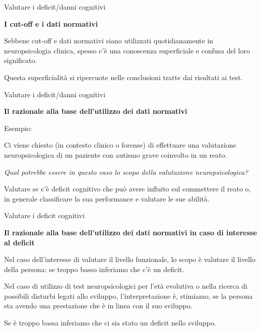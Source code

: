 \documentclass[
  ignorenonframetext,
  aspectratio=169,
]{beamer}
\begin{document}
\begin{frame}{Valutare i deficit/danni cognitivi}
\label{valutare-i-deficitdanni-cognitivi-1}
\begin{center}
  \textbf{I  cut-off e i dati normativi}
\end{center}

Sebbene cut-off e dati normativi siano utilizzati quotidianamente in
neuropsicologia clinica, spesso c'è una conoscenza superficiale e
confusa del loro significato. \vspace{2em}

Questa superficialità si ripercuote nelle conclusioni tratte dai
risultati ai test.
\end{frame}

\begin{frame}{Valutare i deficit/danni cognitivi}
\label{valutare-i-deficitdanni-cognitivi-2}
\begin{center}
  \textbf{Il razionale alla base dell’utilizzo dei dati normativi}
\end{center}

Esempio:

Ci viene chiesto (in contesto clinico o forense) di effettuare una
valutazione neuropsicologica di un paziente con autismo grave coinvolto
in un reato.

\emph{Qual potrebbe essere in questo caso lo scopo della valutazione
neuropsicologica?} \pause

Valutare se c'è deficit cognitivo che può avere influito sul commettere
il reato o, in generale classificare la sua performance e valutare le
sue abilità.
\end{frame}

\begin{frame}{Valutare i deficit cognitivi}
\label{valutare-i-deficit-cognitivi-3}
\begin{center}
  \textbf{Il razionale alla base dell’utilizzo dei dati normativi in caso di interesse al deficit}
\end{center}

Nel caso dell'interesse di valutare il livello funzionale, lo scopo è
valutare il livello della persona: se troppo basso inferiamo che c'è un
deficit.

Nel caso di utilizzo di test neuropsicologici per l'età evolutiva o
nella ricerca di possibili disturbi legati allo sviluppo,
l'interpretazione è, stimiamo, se la persona sta avendo una prestazione
che è in linea con il suo sviluppo.

Se è troppo bassa inferiamo che ci sia stato un deficit nello sviluppo.
\end{frame}
\end{document}
